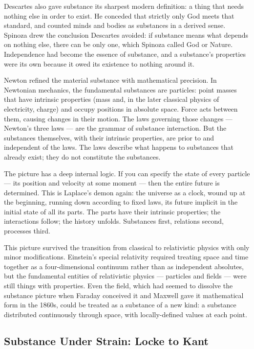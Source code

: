 Descartes also gave substance its sharpest modern definition: a thing that needs nothing else in order to exist. He conceded that strictly only God meets that standard, and counted minds and bodies as substances in a derived sense. Spinoza drew the conclusion Descartes avoided: if substance means what depends on nothing else, there can be only one, which Spinoza called God or Nature. Independence had become the essence of substance, and a substance's properties were its own because it owed its existence to nothing around it.

Newton refined the material substance with mathematical precision. In Newtonian mechanics, the fundamental substances are particles: point masses that have intrinsic properties (mass and, in the later classical physics of electricity, charge) and occupy positions in absolute space. Force acts between them, causing changes in their motion. The laws governing those changes --- Newton's three laws --- are the grammar of substance interaction. But the substances themselves, with their intrinsic properties, are prior to and independent of the laws. The laws describe what happens to substances that already exist; they do not constitute the substances.

The picture has a deep internal logic. If you can specify the state of every particle --- its position and velocity at some moment --- then the entire future is determined. This is Laplace's demon again: the universe as a clock, wound up at the beginning, running down according to fixed laws, its future implicit in the initial state of all its parts. The parts have their intrinsic properties; the interactions follow; the history unfolds. Substances first, relations second, processes third.

This picture survived the transition from classical to relativistic physics with only minor modifications. Einstein's special relativity required treating space and time together as a four-dimensional continuum rather than as independent absolutes, but the fundamental entities of relativistic physics --- particles and fields --- were still things with properties. Even the field, which had seemed to dissolve the substance picture when Faraday conceived it and Maxwell gave it mathematical form in the 1860s, could be treated as a substance of a new kind: a substance distributed continuously through space, with locally-defined values at each point.

\subsection*{Substance Under Strain: Locke to Kant}

